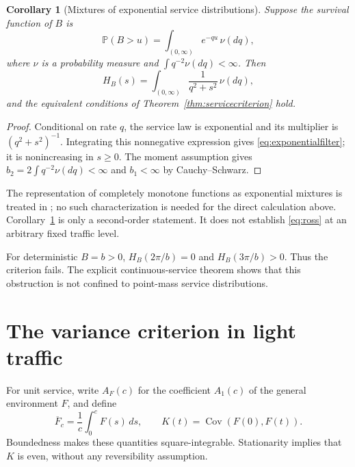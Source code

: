 \documentclass[11pt,reqno]{amsart}
\numberwithin{equation}{section}
\theoremstyle{plain}
\newtheorem{corollary}[theorem]{Corollary}
\theoremstyle{definition}
\newcommand{\Pp}{\mathbb P}
\newcommand{\1}{\mathbf 1}
\DeclareMathOperator{\Cov}{Cov}
\begin{document}
\begin{corollary}[Mixtures of exponential service distributions]\label{cor:exponential}
Suppose the survival function of $B$ is
\[
 \Pp(B>u)=\int_{(0,\infty)}e^{-qu}\,\nu(dq),
\]
where $\nu$ is a probability measure and $\int q^{-2}\nu(dq)<\infty$. Then
\begin{equation}\label{eq:exponentialfilter}
 H_B(s)=\int_{(0,\infty)}\frac{1}{q^2+s^2}\,\nu(dq),
\end{equation}
and the equivalent conditions of Theorem~\ref{thm:servicecriterion} hold.
\end{corollary}
\begin{proof}
Conditional on rate $q$, the service law is exponential and its multiplier is $(q^2+s^2)^{-1}$. Integrating this nonnegative expression gives \eqref{eq:exponentialfilter}; it is nonincreasing in $s\ge0$. The moment assumption gives $b_2=2\int q^{-2}\nu(dq)<\infty$ and $b_1<\infty$ by Cauchy--Schwarz.
\end{proof}
The representation of completely monotone functions as exponential mixtures is treated in \cite{SSV12}; no such characterization is needed for the direct calculation above. Corollary~\ref{cor:exponential} is only a second-order statement. It does not establish \eqref{eq:ross} at an arbitrary fixed traffic level.

For deterministic $B=b>0$, $H_B(2\pi/b)=0$ and $H_B(3\pi/b)>0$. Thus the criterion fails. The explicit continuous-service theorem shows that this obstruction is not confined to point-mass service distributions.

\section{The variance criterion in light traffic}\label{sec:variance}
For unit service, write $A_F(c)$ for the coefficient $A_1(c)$ of the general environment $F$, and define
\begin{equation}\label{eq:average}
 \overline F_c=\frac1c\int_0^c F(s)\,ds,
 \qquad K(t)=\Cov(F(0),F(t)).
\end{equation}
Boundedness makes these quantities square-integrable. Stationarity implies that $K$ is even, without any reversibility assumption.
\end{document}
